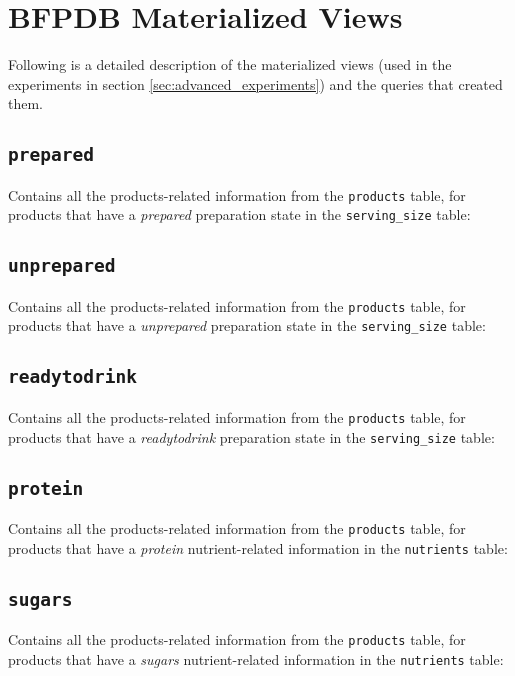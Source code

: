 \chapter{BFPDB Materialized Views}
\label{appendix:bfpdb_materiazlied_views}

Following is a detailed description of the materialized views (used in the experiments in section \ref{sec:advanced_experiments}) and the queries that created them.

\section{\texttt{prepared}}\label{appendix:sec:prepared}
Contains all the products-related information from the \texttt{products} table, for products that have a \textit{prepared} preparation state in the \texttt{serving\_size} table:


\section{\texttt{unprepared}}\label{appendix:sec:unprepared}
Contains all the products-related information from the \texttt{products} table, for products that have a \textit{unprepared} preparation state in the \texttt{serving\_size} table:


\section{\texttt{readytodrink}}\label{appendix:sec:readytodrink}
Contains all the products-related information from the \texttt{products} table, for products that have a \textit{readytodrink} preparation state in the \texttt{serving\_size} table:



\section{\texttt{protein}}\label{appendix:sec:protein}
Contains all the products-related information from the \texttt{products} table, for products that have a \textit{protein} nutrient-related information in the \texttt{nutrients} table:



\section{\texttt{sugars}}\label{appendix:sec:sugars}
Contains all the products-related information from the \texttt{products} table, for products that have a \textit{sugars} nutrient-related information in the \texttt{nutrients} table:



